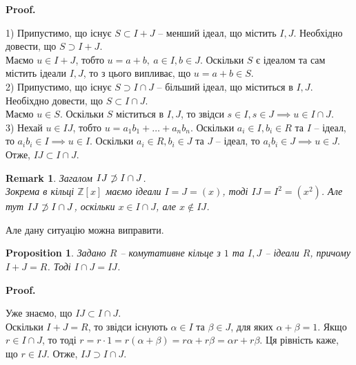 \documentclass[a4paper, 10pt]{article}
\makeatletter
\theoremstyle{theoremdd}
\theoremstyle{theoremdd}
\theoremstyle{theoremdd}
\theoremstyle{theoremdd}
\theoremstyle{theoremdd}
\theoremstyle{theoremdd}
\theoremstyle{theoremdd}
\theoremstyle{theoremdd}
\theoremstyle{theoremdd}
\newtheorem{proposition}[theorem]{Proposition}
\theoremstyle{theoremdd}
\theoremstyle{theoremdd}
\newtheorem{remark}[theorem]{Remark}
\theoremstyle{theoremdd}
\theoremstyle{theoremdd}
\theoremstyle{theoremdd}
\theoremstyle{theoremdd}
\renewenvironment{proof}[1][Proof.\\]{\par
\pushQED{\hfill \qed}%
\normalfont \topsep6\p@\@plus6\p@\relax
\trivlist
\item\relax
{\bfseries
#1\@addpunct{.}}\hspace\labelsep\ignorespaces
}{%
\popQED\endtrivlist\@endpefalse
}
\makeatother
\begin{document}
\begin{proof}
1) Припустимо, що існує $S \subset I+J$ -- менший ідеал, що містить $I,J$. Необхідно довести, що $S \supset I+J$.\\
Маємо $u \in I+J$, тобто $u = a + b,\ a \in I, b \in J$. Оскільки $S$ є ідеалом та сам містить ідеали $I,J$, то з цього випливає, що $u = a + b \in S$.
\bigskip \\
2) Припустимо, що існує $S \supset I \cap J$ -- більший ідеал, що міститься в $I,J$. Необіхдно довести, що $S \subset I \cap J$.\\
Маємо $u \in S$. Оскільки $S$ міститься в $I,J$, то звідси $s \in I, s \in J \implies u \in I \cap J$.
\bigskip \\
3) Нехай $u \in IJ$, тобто $u = a_1b_1 + \dots + a_n b_n$. Оскільки $a_i \in I, b_i \in R$ та $I$ -- ідеал, то $a_ib_i \in I \implies u \in I$. Оскільки $a_i \in R, b_i \in J$ та $J$ -- ідеал, то $a_ib_i \in J \implies u \in J$. Отже, $IJ \subset I \cap J$. 
\end{proof}

\begin{remark}
Загалом $IJ \centernot\supset I \cap J$.\\
Зокрема в кільці $\mathbb{Z}[x]$ маємо ідеали $I = J = (x)$, тоді $IJ = I^2 = (x^2)$. Але тут $IJ \centernot\supset I \cap J$, оскільки $x \in I \cap J$, але $x \notin IJ$.
\end{remark}

Але дану ситуацію можна виправити.

\begin{proposition}
Задано $R$ -- комутативне кільце з $1$ та $I,J$ -- ідеали $R$, причому $I+J = R$. Тоді $I \cap J = IJ$. 
\end{proposition}

\begin{proof}
Уже знаємо, що $IJ \subset I \cap J$.\\
Оскільки $I+J = R$, то звідси існують $\alpha \in I$ та $\beta \in J$, для яких $\alpha + \beta = 1$. Якщо $r \in I \cap J$, то тоді $r = r \cdot 1 = r(\alpha + \beta) = r \alpha + r \beta = \alpha r + r \beta$. Ця рівність каже, що $r \in IJ$. Отже, $IJ \supset I \cap J$.
\end{proof}
\end{document}
